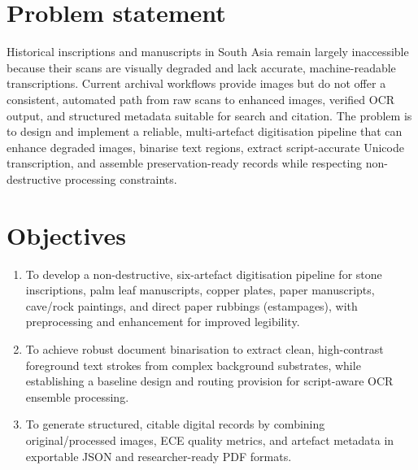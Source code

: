 \section[Problem statement]{Problem statement}
Historical inscriptions and manuscripts in South Asia remain largely inaccessible because their scans are visually degraded and lack accurate, machine-readable transcriptions. Current archival workflows provide images but do not offer a consistent, automated path from raw scans to enhanced images, verified OCR output, and structured metadata suitable for search and citation. The problem is to design and implement a reliable, multi-artefact digitisation pipeline that can enhance degraded images, binarise text regions, extract script-accurate Unicode transcription, and assemble preservation-ready records while respecting non-destructive processing constraints.

\section[Objectives]{Objectives}
\begin{enumerate}
\item To develop a non-destructive, six-artefact digitisation pipeline for stone inscriptions, palm leaf manuscripts, copper plates, paper manuscripts, cave/rock paintings, and direct paper rubbings (estampages), with preprocessing and enhancement for improved legibility.
\item To achieve robust document binarisation to extract clean, high-contrast foreground text strokes from complex background substrates, while establishing a baseline design and routing provision for script-aware OCR ensemble processing.
\item To generate structured, citable digital records by combining original/processed images, ECE quality metrics, and artefact metadata in exportable JSON and researcher-ready PDF formats.
\end{enumerate}

